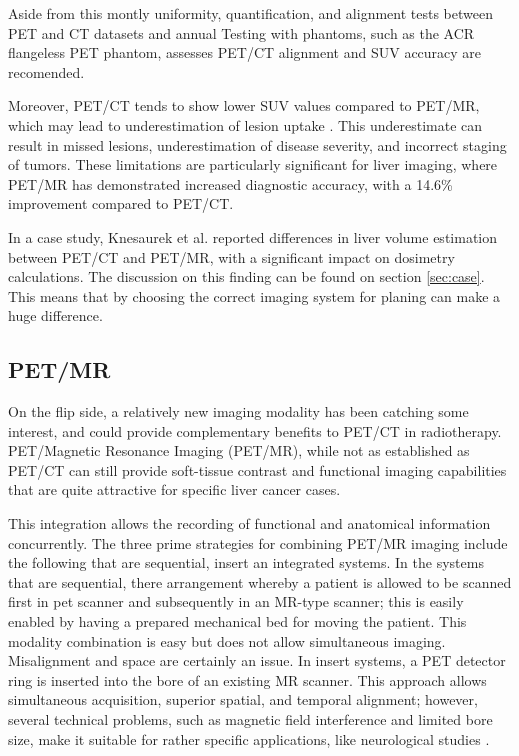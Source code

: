 \documentclass[11pt]{article} %
\begin{document}
\begin{multicols}{2}
Aside from this montly uniformity, quantification, and alignment tests between PET and CT datasets and annual Testing with phantoms, such as the ACR flangeless PET phantom, assesses PET/CT alignment and SUV accuracy are recomended.

Moreover, PET/CT tends to show lower SUV values compared to PET/MR, which may lead to underestimation of lesion uptake \cite{Prado-Wohlwend2023}. This underestimate can result in missed lesions, underestimation of disease severity, and incorrect staging of tumors. These limitations are particularly significant for liver imaging, where PET/MR has demonstrated increased diagnostic accuracy, with a 14.6\% improvement compared to PET/CT\cite{Prado-Wohlwend2023}.

In a case study, Knesaurek et al. \cite{knesaurek2018} reported differences in liver volume estimation between PET/CT and PET/MR, with a significant impact on dosimetry calculations. The discussion on this finding can be found on section \ref{sec:case}. This means that by choosing the correct imaging system for planing can make a huge difference. 


\subsection{PET/MR}
On the flip side, a relatively new imaging modality has been catching some interest, and could provide complementary benefits to PET/CT in radiotherapy. PET/Magnetic Resonance Imaging (PET/MR), while not as established as PET/CT can still provide soft-tissue contrast and functional imaging capabilities that are quite attractive for specific liver cancer cases.

This integration allows the recording of functional and anatomical information concurrently. The three prime strategies for combining PET/MR imaging include the following that are sequential, insert an integrated systems. In the systems that are sequential, there arrangement whereby a patient is allowed to be scanned first in pet scanner and subsequently in an MR-type scanner; this is easily enabled by having a prepared mechanical bed for moving the patient. This modality combination is easy but does not allow  simultaneous imaging. Misalignment and space are certainly an issue. In insert systems, a PET detector ring is inserted into the bore of an existing MR scanner. This approach allows simultaneous acquisition, superior spatial, and temporal alignment; however, several technical problems, such as magnetic field interference and limited bore size, make it suitable for rather specific applications, like neurological studies \cite{ziegler2013}.


\end{multicols}
\end{document}
